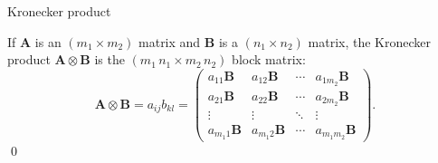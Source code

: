 \begin{definition}
    Kronecker product

    If $\bm{A}$ is an $(m_1 \times m_2)$ matrix and $\bm{B}$ is a $(n_1 \times n_2)$ matrix, the Kronecker product $\bm{A} \otimes \bm{B}$ is the $(m_1\,n_1 \times m_2\, n_2)$ block matrix: 
    \begin{equation}
        \bm{A} \otimes \bm{B} = a_{ij}b_{kl} = 
        \begin{pmatrix}
            {a_{11} \bm{B}} & {a_{12} \bm{B}} & {\cdots} & {a_{1 m_{2}} \bm{B}} \\ 
            {a_{21} \bm{B}} & {a_{22} \bm{B}} & {\cdots} & {a_{2 m_{2}} \bm{B}} \\ 
            {\vdots} & {\vdots} & {\ddots} & {\vdots} \\ 
            {a_{m_1 1} \bm{B}} & {a_{m_1 2} \bm{B}} & {\cdots} & {a_{m_1 m_2} \bm{B}}
        \end{pmatrix}.
    \end{equation}
    \qed
\end{definition}

